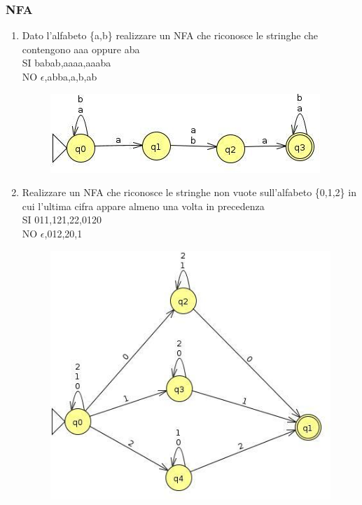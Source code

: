 \documentclass[12pt]{article}
\begin{document}
\subsubsection{NFA}
\begin{enumerate}
  \item 
    Dato l'alfabeto \{a,b\} realizzare un NFA che riconosce le stringhe che 
    contengono aaa oppure aba
    \\
    SI babab,aaaa,aaaba
    \\
    NO $\epsilon$,abba,a,b,ab

\begin{figure}[h]
  \includegraphics[scale = 0.5]{media/es8.jpg}
  \centering
\end{figure}

  \item Realizzare un NFA che riconosce le stringhe non vuote sull'alfabeto \{0,1,2\} in cui l'ultima cifra appare almeno una volta in precedenza
    \\
    SI 011,121,22,0120
    \\
    NO $\epsilon$,012,20,1

\begin{figure}[h]
  \includegraphics[scale = 0.5]{media/es9.jpg}
  \centering
\end{figure}


\end{enumerate}
\end{document}
